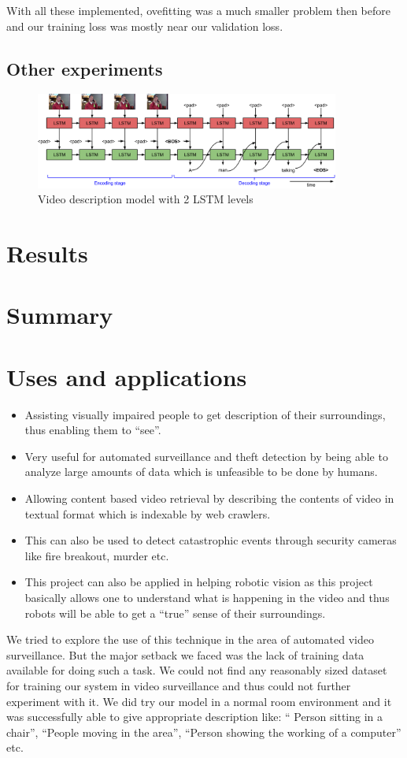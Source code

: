 \documentclass[12pt]{article}
\begin{document}
With all these implemented, ovefitting was a much smaller problem then before and our training loss was mostly near our validation loss.
\subsection{Other experiments}


				\begin{figure}[ht!]
				\centering
					\includegraphics[width=10cm]{s2vt.png}
					\caption{Video description model with 2 LSTM levels\label{fig1}}
				\end{figure}

\section{Results}

\section{Summary}
	

	\section{Uses and applications}
			\begin{itemize}
				\item
					Assisting visually impaired people to get description of their surroundings, thus enabling them to ``see''.
				\item
					Very useful for automated surveillance and theft detection by being able to analyze large amounts of data which is unfeasible to be done by humans.
				\item
					Allowing content based video retrieval by describing the contents of video in textual format which is indexable by web crawlers.
				\item
					This can also be used to detect catastrophic events through security cameras like fire breakout, murder etc.
				\item
					This project can also be applied in helping robotic vision as this project basically allows one to understand what is happening in the video and thus robots will be able to get a ``true'' sense of their surroundings.
			\end{itemize}
			We tried to explore the use of this technique in the area of automated video surveillance. But the major setback
			we faced was the lack of training data available for doing such a task. We could not find any reasonably sized
			dataset for training our system in video surveillance and thus could not further experiment with it. We did try
			our model in a normal room environment and it was successfully able to give appropriate description like: ``
			Person sitting in a chair'', ``People moving in the area'', ``Person showing the working of a computer'' etc.
\end{document}
